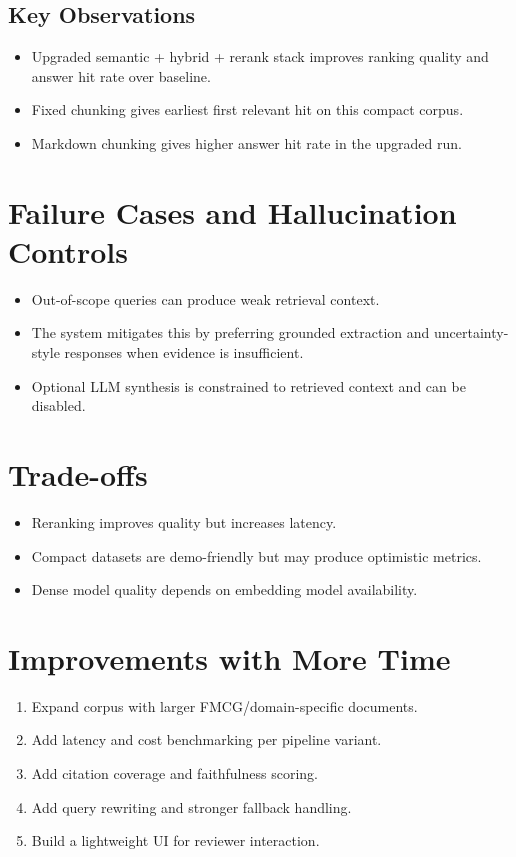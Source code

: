\documentclass[11pt,a4paper]{article}
\begin{document}
\subsection{Key Observations}
\begin{itemize}
  \item Upgraded semantic + hybrid + rerank stack improves ranking quality and answer hit rate over baseline.
  \item Fixed chunking gives earliest first relevant hit on this compact corpus.
  \item Markdown chunking gives higher answer hit rate in the upgraded run.
\end{itemize}

\section{Failure Cases and Hallucination Controls}
\begin{itemize}
  \item Out-of-scope queries can produce weak retrieval context.
  \item The system mitigates this by preferring grounded extraction and uncertainty-style responses when evidence is insufficient.
  \item Optional LLM synthesis is constrained to retrieved context and can be disabled.
\end{itemize}

\section{Trade-offs}
\begin{itemize}
  \item Reranking improves quality but increases latency.
  \item Compact datasets are demo-friendly but may produce optimistic metrics.
  \item Dense model quality depends on embedding model availability.
\end{itemize}

\section{Improvements with More Time}
\begin{enumerate}[leftmargin=1.2em,itemsep=2pt]
  \item Expand corpus with larger FMCG/domain-specific documents.
  \item Add latency and cost benchmarking per pipeline variant.
  \item Add citation coverage and faithfulness scoring.
  \item Add query rewriting and stronger fallback handling.
  \item Build a lightweight UI for reviewer interaction.
\end{enumerate}
\end{document}
